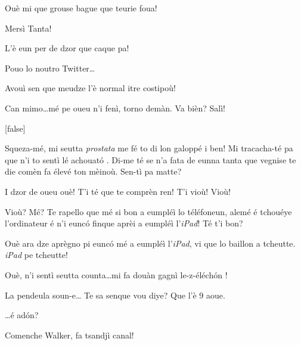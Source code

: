 \begin{drama}
\Tanteunspeaks Ouè mi que grouse bague que teurie foua!

\Alicespeaks{} Mersì Tanta!

\Tantaspeaks{} L'è eun per de dzor que caque pa!

\Alicespeaks Pouo lo noutro Twitter\ldots

\Tanteunspeaks{}Avouì sen que meudze l'è normal itre costipoù!

\Tantaspeaks Can mimo\ldots mé pe oueu n'i fenì, torno demàn. Va bièn? Salì!

[false]%






\Vioupspeaks Squeza-m\'e, mi seutta \textit{prostata} me fé to di lon galoppé i ben! Mi tracacha-t\'e pa que n'i to sentì lé achouat\'o .  Di-me té se n'a fata de eunna tanta que vegnise te die comèn fa élevé ton mèinoù. Sen-tì pa matte?

\Vioujspeaks I dzor de oueu ouè! T'i té que te comprèn ren! T'i  vioù! Vioù!

\Vioupspeaks{} Vioù? Mé? Te rapello que mé si bon a eumpl\'eì lo téléfoneun, alemé é tchouéye l'ordinateur é n'i eunc\'o finque aprèi a eumpl\'eì l'\textit{iPad}! Té t'i bon?

\Vioujspeaks Ouè ara dze aprègno pi eunc\'o mé a eumpl\'eì l'\textit{iPad}, vi que lo baillon a tcheutte. \textit{iPad} pe tcheutte!

\Vioupspeaks Ouè, n'i sentì seutta counta\ldots mi fa douàn  gagnì le-z-éléch\'on !



\Vioupspeaks La pendeula soun-e\ldots {} Te sa senque vou diye? Que l'è 9 aoue.

\Vioujspeaks \ldots é ad\'on?

\Vioupspeaks Comenche Walker, fa tsandjì canal! 


\end{drama}
